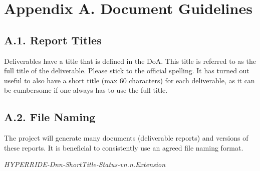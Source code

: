 
\clearpage
\section*{Appendix A. Document Guidelines}
\label{sec:appendix-a}


\subsection*{A.1. Report Titles}
\label{sec:appendix-a1-report-titles}

Deliverables have a title that is defined in the \ac{DoA}. This title is referred to as the full title of the deliverable. Please stick to the official spelling. It has turned out useful to also have a short title (max 60 characters) for each deliverable, as it can be cumbersome if one always has to use the full title. 

\subsection*{A.2. File Naming}
\label{sec:appendix-a2-file-naming}

The project will generate many documents (deliverable reports) and versions of these reports. It is beneficial to consistently use an agreed file naming format. 

\textit{HYPERRIDE-Dnn-ShortTitle-Status-vn.n.Extension}

